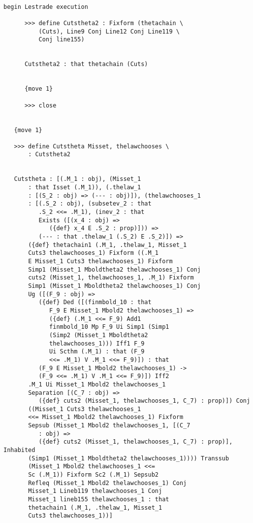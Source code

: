 \documentclass[12pt]{article}
\begin{document}
\begin{verbatim}

begin Lestrade execution

      >>> define Cutstheta2 : Fixform (thetachain \
          (Cuts), Line9 Conj Line12 Conj Line119 \
          Conj line155)


      Cutstheta2 : that thetachain (Cuts)


      {move 1}

      >>> close


   {move 1}

   >>> define Cutstheta Misset, thelawchooses \
       : Cutstheta2


   Cutstheta : [(.M_1 : obj), (Misset_1 
       : that Isset (.M_1)), (.thelaw_1 
       : [(S_2 : obj) => (--- : obj)]), (thelawchooses_1 
       : [(.S_2 : obj), (subsetev_2 : that 
          .S_2 <<= .M_1), (inev_2 : that 
          Exists ([(x_4 : obj) => 
             ({def} x_4 E .S_2 : prop)])) => 
          (--- : that .thelaw_1 (.S_2) E .S_2)]) => 
       ({def} thetachain1 (.M_1, .thelaw_1, Misset_1 
       Cuts3 thelawchooses_1) Fixform ((.M_1 
       E Misset_1 Cuts3 thelawchooses_1) Fixform 
       Simp1 (Misset_1 Mboldtheta2 thelawchooses_1) Conj 
       cuts2 (Misset_1, thelawchooses_1, .M_1) Fixform 
       Simp1 (Misset_1 Mboldtheta2 thelawchooses_1) Conj 
       Ug ([(F_9 : obj) => 
          ({def} Ded ([(finmbold_10 : that 
             F_9 E Misset_1 Mbold2 thelawchooses_1) => 
             ({def} (.M_1 <<= F_9) Add1 
             finmbold_10 Mp F_9 Ui Simp1 (Simp1 
             (Simp2 (Misset_1 Mboldtheta2 
             thelawchooses_1))) Iff1 F_9 
             Ui Scthm (.M_1) : that (F_9 
             <<= .M_1) V .M_1 <<= F_9)]) : that 
          (F_9 E Misset_1 Mbold2 thelawchooses_1) -> 
          (F_9 <<= .M_1) V .M_1 <<= F_9)]) Iff2 
       .M_1 Ui Misset_1 Mbold2 thelawchooses_1 
       Separation [(C_7 : obj) => 
          ({def} cuts2 (Misset_1, thelawchooses_1, C_7) : prop)]) Conj 
       ((Misset_1 Cuts3 thelawchooses_1 
       <<= Misset_1 Mbold2 thelawchooses_1) Fixform 
       Sepsub (Misset_1 Mbold2 thelawchooses_1, [(C_7 
          : obj) => 
          ({def} cuts2 (Misset_1, thelawchooses_1, C_7) : prop)], Inhabited 
       (Simp1 (Misset_1 Mboldtheta2 thelawchooses_1)))) Transsub 
       (Misset_1 Mbold2 thelawchooses_1 <<= 
       Sc (.M_1)) Fixform Sc2 (.M_1) Sepsub2 
       Refleq (Misset_1 Mbold2 thelawchooses_1) Conj 
       Misset_1 Lineb119 thelawchooses_1 Conj 
       Misset_1 lineb155 thelawchooses_1 : that 
       thetachain1 (.M_1, .thelaw_1, Misset_1 
       Cuts3 thelawchooses_1))]



\end{verbatim}
\end{document}
